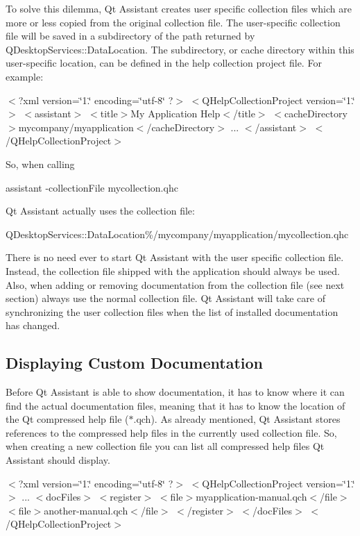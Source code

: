 To solve this dilemma, Qt Assistant creates user specific collection files which are more or less copied from the original collection file. The user-\/specific collection file will be saved in a subdirectory of the path returned by Q\-Desktop\-Services\-::\-Data\-Location. The subdirectory, or cache directory within this user-\/specific location, can be defined in the help collection project file. For example\-:

$<$?xml version=\char`\"{}1.\char`\"{} encoding=\char`\"{}utf-\/8\char`\"{} ?$>$ $<$\-Q\-Help\-Collection\-Project version=\char`\"{}1.\char`\"{}$>$ $<$assistant$>$ $<$title$>$My Application Help$<$/title$>$ $<$cache\-Directory$>$mycompany/myapplication$<$/cache\-Directory$>$ ... $<$/assistant$>$ $<$/\-Q\-Help\-Collection\-Project$>$

So, when calling

assistant -\/collection\-File mycollection.\-qhc

Qt Assistant actually uses the collection file\-:

Q\-Desktop\-Services\-::\-Data\-Location\%/mycompany/myapplication/mycollection.qhc

There is no need ever to start Qt Assistant with the user specific collection file. Instead, the collection file shipped with the application should always be used. Also, when adding or removing documentation from the collection file (see next section) always use the normal collection file. Qt Assistant will take care of synchronizing the user collection files when the list of installed documentation has changed.\hypertarget{assistant_assisant_custom}{}\subsection{Displaying Custom Documentation}\label{assistant_assisant_custom}
Before Qt Assistant is able to show documentation, it has to know where it can find the actual documentation files, meaning that it has to know the location of the Qt compressed help file ($\ast$.qch). As already mentioned, Qt Assistant stores references to the compressed help files in the currently used collection file. So, when creating a new collection file you can list all compressed help files Qt Assistant should display.

$<$?xml version=\char`\"{}1.\char`\"{} encoding=\char`\"{}utf-\/8\char`\"{} ?$>$ $<$\-Q\-Help\-Collection\-Project version=\char`\"{}1.\char`\"{}$>$ ... $<$doc\-Files$>$ $<$register$>$ $<$file$>$myapplication-\/manual.\-qch$<$/file$>$ $<$file$>$another-\/manual.\-qch$<$/file$>$ $<$/register$>$ $<$/doc\-Files$>$ $<$/\-Q\-Help\-Collection\-Project$>$

